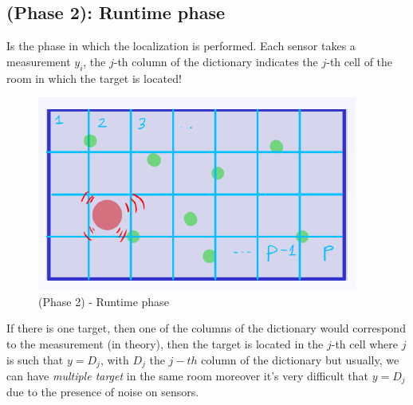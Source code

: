 \subsection{(Phase 2): Runtime phase}
Is the phase in which the localization is performed. Each sensor takes a measurement $y_i$, the $j$-th column of the dictionary indicates the $j$-th cell of the room in which the target is located!  

\begin{figure}[h]
    \centering
    \includegraphics{images/RSS-Runtime.png}
    \caption{(Phase 2) - Runtime phase}
    \label{fig:enter-label}
\end{figure}

\noindent
If there is one target, then one of the columns of the dictionary would correspond to the measurement (in theory), then the target is located in the $j$-th cell where $j$ is such that $y=D_j$, with $D_j$ the $j-th$ column of the dictionary but usually, we can have \textit{multiple target} in the same room moreover it's very difficult that $y=D_j$ due to the presence of noise on sensors.\\

